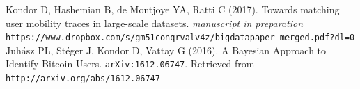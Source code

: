 \documentclass[a4paper]{article}
\begin{document}
\begin{thebibliography}{9}
		Kondor D, Hashemian B, de Montjoye YA, Ratti C (2017).
		Towards matching user mobility traces in large-scale datasets. \emph{manuscript in preparation}
		\texttt{https://www.dropbox.com/s/gm51conqrvalv4z/bigdatapaper\_merged.pdf?dl=0}
	 Juhász PL, Stéger J, Kondor D, Vattay G (2016).
		A Bayesian Approach to Identify Bitcoin Users.
		\texttt{arXiv:1612.06747}. Retrieved from \texttt{http://arxiv.org/abs/1612.06747}
\end{thebibliography}

		
\end{document}
